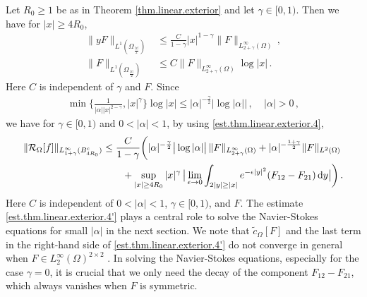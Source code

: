 \documentclass[11pt,a4paper]{article}
\newcommand{\dd}{\,{\rm d}}
\begin{document}
\begin{remark} 
Let $R_0\geq 1$ be as in Theorem \ref{thm.linear.exterior} and let $\gamma \in  [0, 1)$. Then we have for $|x|\geq 4 R_0$,
%
\begin{align*}
\| y F \|_{L^1(\Omega_{ \frac{|x|}{2}})} 
& \leq 
\frac{C}{1-\gamma} 
|x|^{1-\gamma} \| F \|_{L^\infty_{2+\gamma} (\Omega)}\,,\\
\| F \|_{ L^1(\Omega_{ \frac{|x|}{2}})} 
& \leq 
C \| F \|_{L^\infty_{2+\gamma} (\Omega)}  \log |x| \,.
\end{align*}
%
Here $C$ is independent of $\gamma$ and $F$. Since 
%
\begin{align*}
 \min \big \{  \frac{1}{|\alpha| |x|^{2-\gamma}}, |x|^\gamma \big \} \log |x|  \leq |\alpha|^{-\frac{\gamma}{2}} \big |\log |\alpha |\big |\,,~~~~~|\alpha|>0\,,
\end{align*}
%
we have for $\gamma \in [0, 1)$ and $0<|\alpha|<1$, by using \eqref{est.thm.linear.exterior.4}, 
%
\begin{align}
\begin{split}
\| \mathcal{R}_\Omega [f] \|_{L^{\infty}_{1+\gamma} (B^{{\rm c}}_{4R_{0}})} 
& \le \frac{C}{1-\gamma} \bigg (   |\alpha|^{-\frac{\gamma}{2}} \big |\log |\alpha| \big | \, \| F \|_{L^\infty_{2+\gamma} (\Omega)}   
 + |\alpha|^{-\frac{1+\gamma}{2}}  \| F\|_{L^2(\Omega)}  \\
& \qquad
+ \sup_{|x|\geq 4 R_0} |x|^{\gamma} \, \big | \lim_{\epsilon \rightarrow 0}  \int_{2 |y|\geq |x|} e^{-\epsilon |y|^2} (F_{12}-F_{21} ) \dd y \big | \bigg )  \,. \label{est.thm.linear.exterior.4'} 
\end{split}
\end{align}
%
Here $C$ is independent of $0<|\alpha|<1$, $\gamma\in [0,1)$, and $F$.
The estimate \eqref{est.thm.linear.exterior.4'} plays a central role to solve the Navier-Stokes equations for small $|\alpha|$ in the next section. We note that $\tilde c_\Omega [F]$ and the last term in the right-hand side of \eqref{est.thm.linear.exterior.4'} do not converge in general when $F\in L^\infty_{2} (\Omega)^{2\times 2}$ . In solving the Navier-Stokes equations, especially for the case $\gamma=0$, it is crucial that we only need the decay of the component $F_{12}-F_{21}$, which always vanishes when $F$ is symmetric.
\end{remark}
\end{document}
